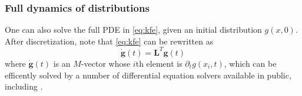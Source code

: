 \documentclass[11pt]{article}
\begin{document}
\subsubsection{Full dynamics of distributions}
One can also solve the full PDE in \eqref{eq:kfe}, given an initial distribution $g(x, 0)$. After discretization, note that \eqref{eq:kfe} can be rewritten as
\begin{equation}\label{eq:kfe-discretized}
\dot{\mathbf{g}}(t) = \mathbf{L}^T \mathbf{g}(t)
\end{equation}
where $\dot{\mathbf{g}}(t)$ is an $M$-vector whose $i$th element is $\partial_{t} g(x_i, t)$, which can be efficently solved by a number of differential equation solvers available in public, including \cite{rackauckas17}.

\newpage

\end{document}
